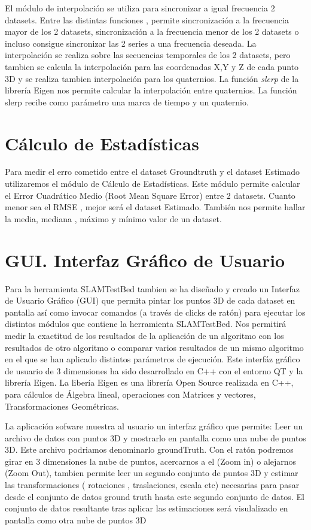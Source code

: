 	El módulo de interpolación se utiliza para sincronizar a igual frecuencia 2 datasets.
	Entre las distintas funciones , permite sincronización a la frecuencia mayor de los 2 datasets, sincronización a la frecuencia menor de los 2 datasets o incluso consigue sincronizar las 2 series a una frecuencia deseada. La interpolación se realiza sobre las secuencias temporales de los 2 datasets, pero tambien se calcula la interpolación para las coordenadas X,Y y Z de cada punto 3D y se realiza tambien interpolación para los quaternios. La función \textit{slerp} de la librería Eigen nos permite calcular la interpolación entre quaternios. La función slerp recibe como parámetro una marca de tiempo y un quaternio.

\section{Cálculo de Estadísticas}

Para medir el erro cometido entre el dataset Groundtruth y el dataset Estimado utilizaremos el módulo de Cálculo de Estadísticas.
Este módulo permite calcular el Error Cuadrático Medio (Root Mean Square Error) entre 2 datasets.
Cuanto menor sea el RMSE , mejor será el dataset Estimado.
También nos permite hallar la media, mediana , máximo y mínimo valor de un dataset.


\section{GUI. Interfaz Gráfico de Usuario}

Para la herramienta SLAMTestBed tambien se ha diseñado y creado un Interfaz de Usuario Gráfico (GUI) que permita pintar los puntos 3D de cada dataset en pantalla así como invocar comandos (a través de clicks de ratón) para ejecutar los distintos módulos que contiene la herramienta SLAMTestBed.
Nos permitirá medir la exactitud de los resultados de la aplicación de un algoritmo con los resultados de otro algoritmo o comparar varios resultados de un mismo algoritmo en el que se han aplicado distintos parámetros de ejecución.
Este interfáz gráfico de usuario de 3 dimensiones ha sido desarrollado en C++ con el entorno QT y la librería Eigen. La libería Eigen es una librería Open Source realizada en C++, para cálculos de Álgebra lineal, operaciones con Matrices y vectores, Transformaciones Geométricas. 

La aplicación sofware muestra al usuario un interfaz gráfico que permite:
Leer un archivo de datos con puntos 3D y mostrarlo en pantalla como una nube de puntos 3D. Este archivo podriamos denominarlo groundTruth.
Con el ratón podremos girar en 3 dimensiones la nube de puntos, acercarnos a el (Zoom in) o alejarnos (Zoom Out),
tambien permite leer un segundo conjunto de puntos 3D y estimar las transformaciones ( rotaciones , traslaciones, escala etc)  necesarias para pasar desde el conjunto de datos ground truth hasta este segundo conjunto de datos. El conjunto de datos resultante tras aplicar las estimaciones será visulalizado en pantalla como otra nube de puntos 3D


